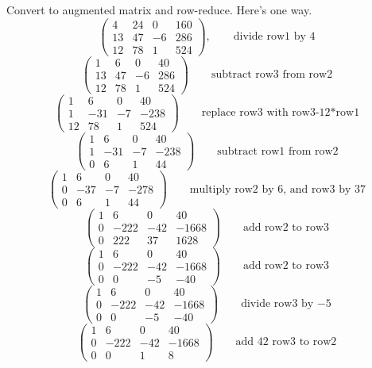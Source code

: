 \documentclass[10pt,twoside]{article}
\begin{document}
Convert to augmented matrix and row-reduce.  Here's one way.
\[\begin{pmatrix}
4 & 24 & 0 & 160\\
13 & 47 & -6 & 286\\
12 & 78 & 1 & 524
\end{pmatrix}, \qquad\text{divide row1 by 4}
\]
\[\begin{pmatrix}
1 & 6 & 0 & 40\\
13 & 47 & -6 & 286\\
12 & 78 & 1 & 524
\end{pmatrix} \qquad\text{subtract row3 from row2}\]
\[\begin{pmatrix}
1 & 6 & 0 & 40\\
 1 & -31 & -7 & -238\\
12 & 78 & 1 & 524
\end{pmatrix}\qquad\text{replace row3 with row3-12*row1}\]
\[\begin{pmatrix}
1 & 6 & 0 & 40\\
1 & -31 & -7 & -238\\
0 & 6 & 1 & 44
\end{pmatrix} \qquad\text{subtract row1 from row2}\]
\[\begin{pmatrix}
1 & 6 & 0 & 40\\
0 & -37 & -7 & -278\\
0 & 6 & 1 & 44
\end{pmatrix} \qquad\text{multiply row2 by 6, and row3 by 37}\]
\[\begin{pmatrix}
1 & 6 & 0 & 40\\
0 & -222 & -42 & -1668\\
0 & 222 & 37 & 1628
\end{pmatrix} \qquad\text{add row2 to row3}\]
\[\begin{pmatrix}
1 & 6 & 0 & 40\\
0 & -222 & -42 & -1668\\
0 & 0 & -5 & -40
\end{pmatrix} \qquad\text{add row2 to row3}\]
\[\begin{pmatrix}
1 & 6 & 0 & 40\\
0 & -222 & -42 & -1668\\
0 & 0 & -5 & -40
\end{pmatrix} \qquad\text{divide row3 by $-5$}\]
\[\begin{pmatrix}
1 & 6 & 0 & 40\\
0 & -222 & -42 & -1668\\
0 & 0 & 1 & 8
\end{pmatrix} \qquad\text{add 42 row3 to row2}\]
\end{document}
